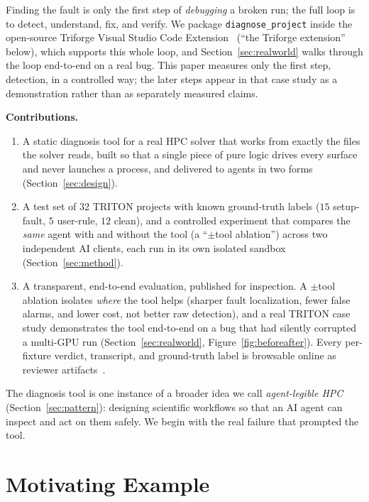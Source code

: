 \documentclass[conference]{IEEEtran}
\begin{document}
Finding the fault is only the first step of \emph{debugging} a broken run; the full loop is to
detect, understand, fix, and verify. We package \texttt{diagnose\_project} inside the open-source
Triforge Visual Studio Code Extension~\cite{triforge} (``the Triforge extension'' below), which
supports this whole loop, and
Section~\ref{sec:realworld} walks through the loop end-to-end on a real bug. This
paper measures only the first step, detection, in a controlled way; the later steps appear in
that case study as a demonstration rather than as separately measured claims.

\noindent\textbf{Contributions.}
\begin{enumerate}
  \item A static diagnosis tool for a real HPC solver that works from exactly the files the solver
        reads, built so that a single piece of pure logic drives every surface and never launches a
        process, and delivered to agents in two forms (Section~\ref{sec:design}).
  \item A test set of 32 TRITON projects with known ground-truth labels ($15$ setup-fault, $5$
        user-rule, $12$ clean), and a controlled experiment
        that compares the \emph{same} agent with and without the tool (a ``$\pm$tool
        ablation'') across two independent AI clients, each run in its own isolated sandbox
        (Section~\ref{sec:method}).
  \item A transparent, end-to-end evaluation, published for inspection. A $\pm$tool ablation
        isolates \emph{where} the tool helps (sharper fault localization, fewer false alarms, and
        lower cost, not better raw detection), and a real TRITON case study demonstrates the tool
        end-to-end on a bug that had silently corrupted a multi-GPU run (Section~\ref{sec:realworld},
        Figure~\ref{fig:beforeafter}). Every per-fixture verdict, transcript, and ground-truth label
        is browsable online as reviewer
        artifacts~\cite{artifact-tool,artifact-oracle,artifact-ablation,artifact-human}.
\end{enumerate}

The diagnosis tool is one instance of a broader idea we call \emph{agent-legible HPC}
(Section~\ref{sec:pattern}): designing scientific workflows so that an AI agent can inspect and
act on them safely. We begin with the real failure that prompted the tool.

\section{Motivating Example}
\label{sec:motivation}
\end{document}
